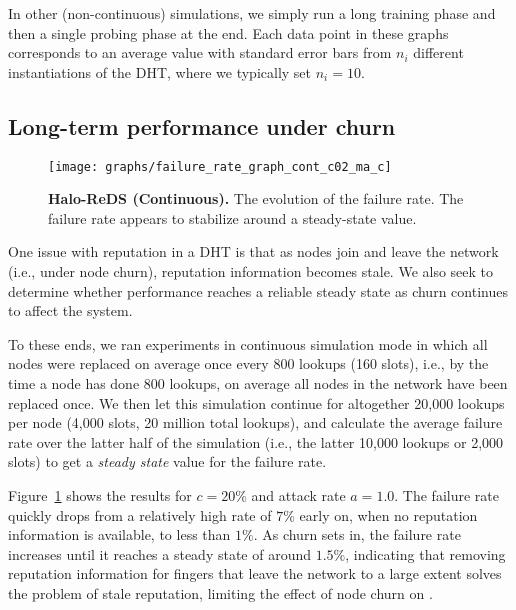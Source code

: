 In other (non-continuous) simulations, we simply run a long training
phase and then a single probing phase at the end. Each data point in
these graphs corresponds to an average value with standard error bars
from $n_i$ different instantiations of the DHT, where we typically set
$n_i=10$.





\subsection{Long-term performance under churn}
\label{sec:eval-churn}

\begin{figure}[t]
\centering
\texttt{[image: graphs/failure\_rate\_graph\_cont\_c02\_ma\_c]}
\caption{{\bf Halo-ReDS (Continuous).} The evolution of the failure
   rate. The failure rate appears to stabilize around a steady-state
   value.}    \label{fig:churn_c02}
\end{figure}

One issue with reputation in a DHT is that as nodes join and leave the
network (i.e., under node churn), reputation information becomes
stale. 
We also seek to determine whether \sys performance reaches a reliable
steady state as churn continues to affect the system.


To these ends, we ran \hsys experiments in continuous simulation mode in
which all nodes were replaced on average once every 800 lookups (160
slots), i.e., by the time a node has done 800 lookups, on average all
nodes in the network have been replaced once. We then let this
simulation continue for altogether 20,000 lookups per node (4,000 slots,
20 million total lookups), and calculate the average failure rate over
the latter half of the simulation (i.e., the latter 10,000 lookups or
2,000 slots) to get a \emph{steady state} value for the failure rate.



Figure~\ref{fig:churn_c02} shows the results for $c=20\%$ and attack
rate $a=1.0$.  The failure rate quickly drops from a relatively high
rate of $7\%$ early on, when no reputation information is available, to
less than $1\%$. As churn sets in, the failure rate increases until it
reaches a steady state of around $1.5\%$, indicating that removing
reputation information for fingers that leave the network to a large
extent solves the problem of stale reputation, limiting the effect of
node churn on \sys.



